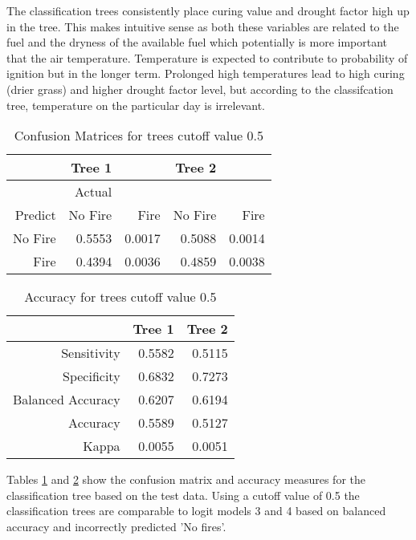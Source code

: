 \documentclass[11pt,a4paper]{article}
\begin{document}
The classification trees consistently place  curing value and drought factor high up in the tree. This makes intuitive sense as both these variables are related to the fuel and the dryness of the available fuel which potentially is more important that the air temperature. Temperature is expected to contribute to probability of ignition but in the longer term. Prolonged high temperatures lead to high curing (drier grass) and higher drought factor level, but according to the classifcation tree, temperature on the particular day is irrelevant. 

\begin{table}[ht]
	\centering
	\begin{tabular}{r|rr|rr}
		\hline
		  & Tree 1 &  & Tree 2 & \\ 
		\hline
		& Actual   &  &  &   \\ 
		Predict  & No Fire & Fire & No Fire & Fire\\ 
		\hline
No Fire  & 0.5553 & 0.0017 & 0.5088 & 0.0014 \\ 
Fire  & 0.4394 & 0.0036 & 0.4859 & 0.0038 \\ 
		\hline
	\end{tabular}
	\caption{Confusion Matrices for trees cutoff value 0.5}
	\label{table:tcm2}
\end{table}


\begin{table}[H]
	\centering
	\begin{tabular}{rrr}
		\hline
		 & Tree 1 & Tree 2 \\ 
		\hline
		Sensitivity  & 0.5582 & 0.5115 \\ 
		Specificity & 0.6832 & 0.7273 \\  
		Balanced Accuracy  & 0.6207 & 0.6194 \\ 
		Accuracy  & 0.5589 & 0.5127 \\ 
		Kappa & 0.0055 & 0.0051 \\ 
		\hline
	\end{tabular}
	\caption{Accuracy for trees cutoff value 0.5}
	\label{table:tacc2}
\end{table}

Tables \ref{table:tcm2} and \ref{table:tacc2} show the confusion matrix and accuracy measures for the classification tree based on the test data. Using a cutoff value of 0.5 the classification trees are comparable to logit models 3 and 4 based on balanced accuracy and incorrectly predicted 'No fires'. 
\end{document}
